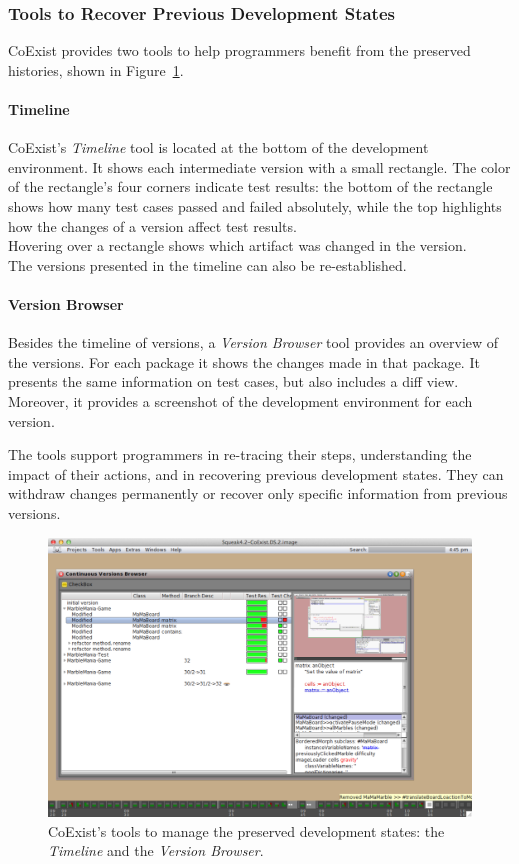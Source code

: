 \subsubsection{Tools to Recover Previous Development States}

CoExist provides two tools to help programmers benefit from the preserved histories, shown in Figure~\ref{fig:CoExist}.

\paragraph{Timeline}
CoExist's \emph{Timeline} tool is located at the bottom of the development environment.
It shows each intermediate version with a small rectangle.
The color of the rectangle's four corners indicate test results: the bottom of the rectangle shows how many test cases passed and failed absolutely, while the top highlights how the changes of a version affect test results.\\
Hovering over a rectangle shows which artifact was changed in the version.\\
The versions presented in the timeline can also be re-established.

\paragraph{Version Browser}
Besides the timeline of versions, a \emph{Version Browser} tool provides an overview of the versions.
For each package it shows the changes made in that package.
It presents the same information on test cases, but also includes a diff view.
Moreover, it provides a screenshot of the development environment for each version.

The tools support programmers in re-tracing their steps, understanding the impact of their actions, and in recovering previous development states.
They can withdraw changes permanently or recover only specific information from previous versions.

\begin{figure}[h]
    \centering
    \includegraphics[width=\textwidth]{figures/2_background/4_coexistTools.pdf}
    \caption{CoExist's tools to manage the preserved development states: the \emph{Timeline} and the \emph{Version Browser}.}
    \label{fig:CoExist}
\end{figure}

